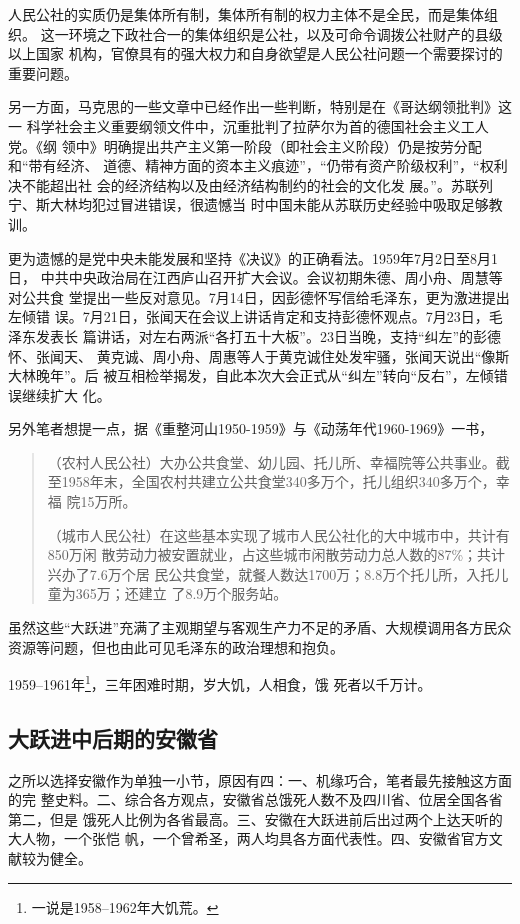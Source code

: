 人民公社的实质仍是集体所有制，集体所有制的权力主体不是全民，而是集体组织。
这一环境之下政社合一的集体组织是公社，以及可命令调拨公社财产的县级以上国家
机构，官僚具有的强大权力和自身欲望是人民公社问题一个需要探讨的重要问题。

另一方面，马克思的一些文章中已经作出一些判断，特别是在《哥达纲领批判》这一
科学社会主义重要纲领文件中，沉重批判了拉萨尔为首的德国社会主义工人党。《纲
领中》明确提出共产主义第一阶段（即社会主义阶段）仍是按劳分配和“带有经济、
道德、精神方面的资本主义痕迹”，“仍带有资产阶级权利”，“权利决不能超出社
会的经济结构以及由经济结构制约的社会的文化发
展。”。苏联列宁、斯大林均犯过冒进错误，很遗憾当
时中国未能从苏联历史经验中吸取足够教训。

更为遗憾的是党中央未能发展和坚持《决议》的正确看法。1959年7月2日至8月1日，
中共中央政治局在江西庐山召开扩大会议。会议初期朱德、周小舟、周慧等对公共食
堂提出一些反对意见。7月14日，因彭德怀写信给毛泽东，更为激进提出左倾错
误。7月21日，张闻天在会议上讲话肯定和支持彭德怀观点。7月23日，毛泽东发表长
篇讲话，对左右两派“各打五十大板”。23日当晚，支持“纠左”的彭德怀、张闻天、
黄克诚、周小舟、周惠等人于黄克诚住处发牢骚，张闻天说出“像斯大林晚年”。后
被互相检举揭发，自此本次大会正式从“纠左”转向“反右”，左倾错误继续扩大
化。

另外笔者想提一点，据《重整河山1950-1959》与《动荡年代1960-1969》一书，
\begin{quotation}
  （农村人民公社）大办公共食堂、幼儿园、托儿所、幸福院等公共事业。截
  至1958年末，全国农村共建立公共食堂340多万个，托儿组织340多万个，幸福
  院15万所。

  （城市人民公社）在这些基本实现了城市人民公社化的大中城市中，共计有850万闲
  散劳动力被安置就业，占这些城市闲散劳动力总人数的87\%；共计兴办了7.6万个居
  民公共食堂，就餐人数达1700万；8.8万个托儿所，入托儿童为365万；还建立
  了8.9万个服务站。
\end{quotation}
虽然这些“大跃进”充满了主观期望与客观生产力不足的矛盾、大规模调用各方民众
资源等问题，但也由此可见毛泽东的政治理想和抱负。

1959--1961年\footnote{一说是1958--1962年大饥荒。}，三年困难时期，岁大饥，人相食，饿
死者以千万计。

\subsection{大跃进中后期的安徽省}

之所以选择安徽作为单独一小节，原因有四：一、机缘巧合，笔者最先接触这方面的完
整史料。二、综合各方观点，安徽省总饿死人数不及四川省、位居全国各省第二，但是
饿死人比例为各省最高。三、安徽在大跃进前后出过两个上达天听的大人物，一个张恺
帆，一个曾希圣，两人均具各方面代表性。四、安徽省官方文献较为健全。

